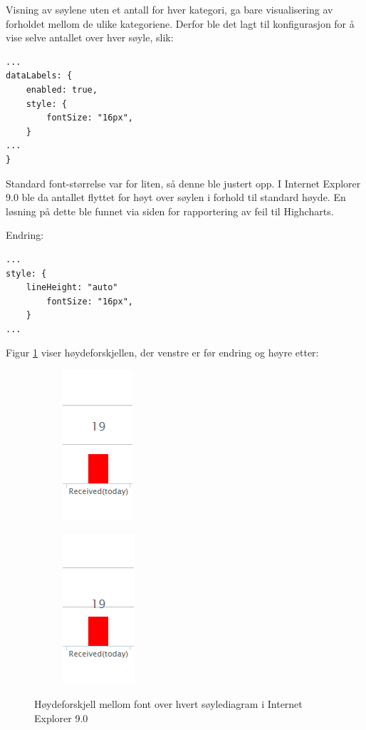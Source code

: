 Visning av søylene uten et antall for hver kategori, ga bare visualisering av forholdet mellom de ulike kategoriene. Derfor ble det lagt til konfigurasjon for å vise selve antallet over hver søyle, slik: 
\begin{lstlisting}
...
dataLabels: {
    enabled: true,
    style: {
        fontSize: "16px",
    }
...
}
\end{lstlisting}
Standard font-størrelse var for liten, så denne ble justert opp. I Internet Explorer 9.0 ble da antallet flyttet for høyt over søylen i forhold til standard høyde. En løsning på dette ble funnet via siden for rapportering av feil til Highcharts\cite{iebug}. 

Endring:
\begin{lstlisting}[style=example]
...
style: {
	lineHeight: "auto"
        fontSize: "16px",
    }
...
\end{lstlisting}

Figur \ref{IE_bug} viser høydeforskjellen, der venstre er før endring og høyre etter:
\begin{figure}[H]
\centering
\begin{subfigure}
  \centering
  \includegraphics[scale=0.7]{img/IE_footprints_bug}
\end{subfigure}
\begin{subfigure}
  \centering
  \includegraphics[scale=0.7]{img/IE_footprints_fix}
\end{subfigure}
\caption{Høydeforskjell mellom font over hvert søylediagram i Internet Explorer 9.0}
\label{IE_bug}
\end{figure}

